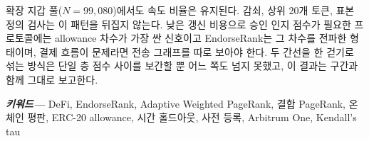 확장 지갑 풀($N=99{,}080$)에서도 속도 비율은 유지된다. 감쇠, 상위 20개 토큰, 표본 정의 검사는 이 패턴을 뒤집지 않는다. 낮은 갱신 비용으로 승인 인지 점수가 필요한 프로토콜에는 allowance 차수가 가장 싼 신호이고 EndorseRank는 그 차수를 전파한 형태이며, 결제 흐름이 문제라면 전송 그래프를 따로 보아야 한다. 두 간선을 한 걷기로 섞는 방식은 단일 층 점수 사이를 보간할 뿐 어느 쪽도 넘지 못했고, 이 결과는 구간과 함께 그대로 보고한다.

\textbf{\emph{키워드---}} DeFi, EndorseRank, Adaptive Weighted PageRank, 결합 PageRank, 온체인 평판, ERC-20 allowance, 시간 홀드아웃, 사전 등록, Arbitrum One, Kendall's tau
